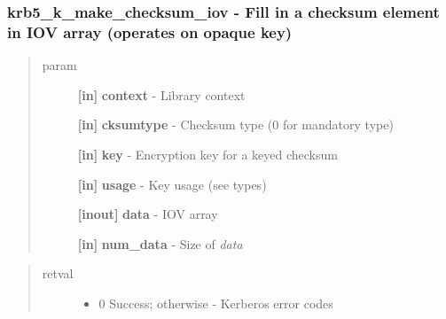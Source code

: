 \documentclass[letterpaper,10pt,english]{sphinxmanual}
\begin{document}
\subsubsection{krb5\_k\_make\_checksum\_iov -  Fill in a checksum element in IOV array (operates on opaque key)}
\label{appdev/refs/api/krb5_k_make_checksum_iov::doc}\label{appdev/refs/api/krb5_k_make_checksum_iov:krb5-k-make-checksum-iov-fill-in-a-checksum-element-in-iov-array-operates-on-opaque-key}

\begin{fulllineitems}
\label{appdev/refs/api/krb5_k_make_checksum_iov:krb5_k_make_checksum_iov}
\end{fulllineitems}

\begin{quote}\begin{description}
\item[{param}] \leavevmode
\textbf{{[}in{]}} \textbf{context} - Library context

\textbf{{[}in{]}} \textbf{cksumtype} - Checksum type (0 for mandatory type)

\textbf{{[}in{]}} \textbf{key} - Encryption key for a keyed checksum

\textbf{{[}in{]}} \textbf{usage} - Key usage (see  types)

\textbf{{[}inout{]}} \textbf{data} - IOV array

\textbf{{[}in{]}} \textbf{num\_data} - Size of \emph{data}

\end{description}\end{quote}
\begin{quote}\begin{description}
\item[{retval}] \leavevmode\begin{itemize}
\item {} 
0   Success; otherwise - Kerberos error codes

\end{itemize}

\end{description}\end{quote}
\end{document}
